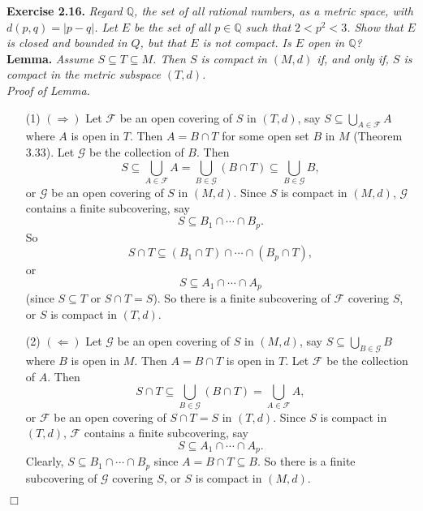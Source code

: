 \documentclass{article}
\begin{document}



\textbf{Exercise 2.16.}
\emph{Regard $\mathbb{Q}$, the set of all rational numbers, as a metric space,
with $d(p,q) = |p-q|$.
Let $E$ be the set of all $p \in \mathbb{Q}$ such that $2 < p^2 < 3$.
Show that $E$ is closed and bounded in $Q$,
but that $E$ is not compact.
Is $E$ open in $\mathbb{Q}$?} \\

\textbf{Lemma.}
\emph{Assume $S \subseteq T \subseteq M$.
Then $S$ is compact in $(M,d)$ if, and only if,
$S$ is compact in the metric subspace $(T,d)$. } \\

\emph{Proof of Lemma.}
\begin{enumerate}
\item[(1)]
$(\Longrightarrow)$
Let $\mathscr{F}$ be an open covering of $S$ in $(T,d)$, say
$S \subseteq \bigcup_{A \in \mathscr{F}} A$ where $A$ is open in $T$.
Then $A = B \cap T$ for some open set $B$ in $M$ (Theorem 3.33).
Let $\mathscr{G}$ be the collection of $B$.
Then
$$S \subseteq
\bigcup_{A \in \mathscr{F}} A
= \bigcup_{B \in \mathscr{G}} (B \cap T)
\subseteq \bigcup_{B \in \mathscr{G}} B,$$
or $\mathscr{G}$ be an open covering of $S$ in $(M,d)$.
Since $S$ is compact in $(M,d)$,
$\mathscr{G}$ contains a finite subcovering, say
$$S \subseteq B_1 \cap \cdots \cap B_p.$$
So $$S \cap T \subseteq (B_1\cap T) \cap \cdots \cap (B_p \cap T),$$
or $$S \subseteq A_1 \cap \cdots \cap A_p$$ (since $S \subseteq T$ or $S \cap T = S$).
So there is a finite subcovering of $\mathscr{F}$ covering $S$,
or $S$ is compact in $(T,d)$.
\item[(2)]
$(\Longleftarrow)$
Let $\mathscr{G}$ be an open covering of $S$ in $(M,d)$, say
$S \subseteq \bigcup_{B \in \mathscr{G}} B$ where $B$ is open in $M$.
Then $A = B \cap T$ is open in $T$.
Let $\mathscr{F}$ be the collection of $A$.
Then
$$S \cap T \subseteq
\bigcup_{B \in \mathscr{G}} (B \cap T)
= \bigcup_{A \in \mathscr{F}} A,$$
or $\mathscr{F}$ be an open covering of $S \cap T = S$ in $(T,d)$.
Since $S$ is compact in $(T,d)$,
$\mathscr{F}$ contains a finite subcovering, say
$$S \subseteq A_1 \cap \cdots \cap A_p.$$
Clearly, $S \subseteq B_1 \cap \cdots \cap B_p$ since $A = B \cap T \subseteq B$.
So there is a finite subcovering of $\mathscr{G}$ covering $S$,
or $S$ is compact in $(M,d)$.
\end{enumerate}
$\Box$ \\
\end{document}
